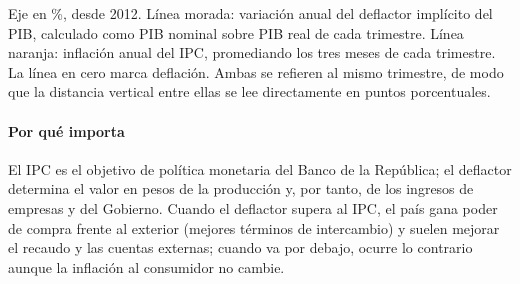 \begin{leer}
Eje en \%, desde 2012. Línea morada: variación anual del deflactor implícito del PIB, calculado como PIB nominal sobre PIB real de cada trimestre. Línea naranja: inflación anual del IPC, promediando los tres meses de cada trimestre. La línea en cero marca deflación. Ambas se refieren al mismo trimestre, de modo que la distancia vertical entre ellas se lee directamente en puntos porcentuales.
\end{leer}

\paragraph{Por qué importa}
El IPC es el objetivo de política monetaria del Banco de la República; el deflactor determina el valor en pesos de la producción y, por tanto, de los ingresos de empresas y del Gobierno. Cuando el deflactor supera al IPC, el país gana poder de compra frente al exterior (mejores términos de intercambio) y suelen mejorar el recaudo y las cuentas externas; cuando va por debajo, ocurre lo contrario aunque la inflación al consumidor no cambie.


